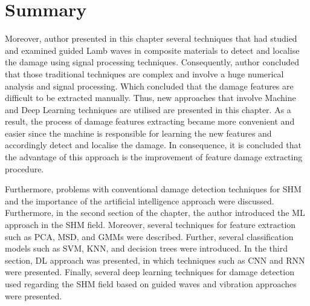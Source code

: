 \section{Summary}
\label{sec34}
Moreover, author presented in this chapter several techniques that had studied and examined guided Lamb waves in composite materials to detect and localise the damage using signal processing techniques. 
Consequently, author concluded that those traditional techniques are complex and involve a huge numerical analysis and signal processing. Which concluded that the damage features are difficult to be extracted manually. 
Thus, new approaches that involve Machine and Deep Learning techniques are utilised are presented in this chapter. 
As a result, the process of damage features extracting became more convenient and easier since the machine is responsible for learning the new features and accordingly  detect and localise the damage. 
In consequence, it is concluded that the advantage of this approach is the improvement of feature damage extracting procedure.

Furthermore, problems with conventional damage detection techniques for SHM and the importance of the artificial intelligence approach were discussed.
Furthermore, in the second section of the chapter, the author introduced the ML approach in the SHM field.
Moreover, several techniques for feature extraction such as PCA, MSD, and GMMs were described. 
Further, several classification models such as SVM, KNN, and decision trees were introduced.
In the third section, DL approach was presented, in which techniques such as CNN  and RNN were presented.
Finally, several deep learning techniques for damage detection used regarding the SHM field based on guided waves and vibration approaches were presented.